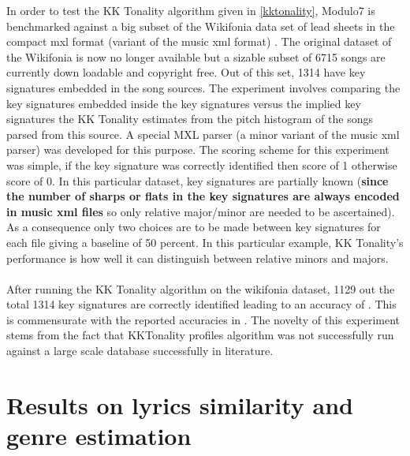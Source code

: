 \noindent In order to test the KK Tonality algorithm given in \ref{kktonality}, Modulo7 is benchmarked against a big subset of the Wikifonia data set of lead sheets in the compact mxl format (variant of the music xml format) \cite{WikifoniaDataset}. The original dataset of the Wikifonia is now no longer available but a sizable subset of 6715 songs are currently down loadable and copyright free. Out of this set, 1314 have key signatures embedded in the song sources. The experiment involves comparing the key signatures embedded inside the key signatures versus the implied key signatures the KK Tonality estimates from the pitch histogram of the songs parsed from this source. A special MXL parser (a minor variant of the music xml parser) was developed for this purpose. The scoring scheme for this experiment was simple, if the key signature was correctly identified then score of 1 otherwise score of 0. In this particular dataset, key signatures are partially known (\textbf{since the number of sharps or flats in the key signatures are always encoded in music xml files} so only relative major/minor are needed to be ascertained). As a consequence only two choices are to be made between key signatures for each file giving a baseline of 50 percent. In this particular example, KK Tonality's performance is how well it can distinguish between relative minors and majors. \\\\
After running the KK Tonality algorithm on the wikifonia dataset, 1129 out the total 1314 key signatures are correctly identified leading to an accuracy of . This is commensurate with the reported accuracies in \cite{kkTonalityKeyFinding}. The novelty of this experiment stems from the fact that KKTonality profiles algorithm was not successfully run against a large scale database successfully in literature. 

\section{Results on lyrics similarity and genre estimation}

